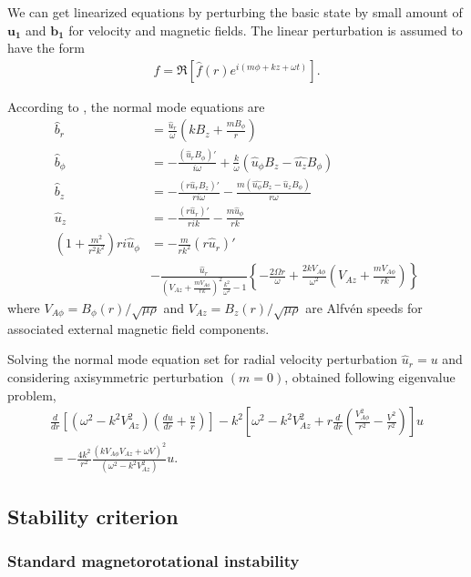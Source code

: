 \documentclass{jfm}
\begin{document}
We can get linearized equations by perturbing the basic state by small amount
of $\mathbf{u_1}$ and $\mathbf{b_1}$ for velocity and magnetic fields. The
linear perturbation is assumed to have the form
\begin{align}
    f=\Re\left[\hat{f}(r)e^{i(m\phi+kz+\omega t)} \right].
\end{align}

According to \cite{Acheson1972}, the normal mode equations are
\begin{align}
    \hat{b}_r &=\frac{\hat{u}_r}{\omega}\left(k B_z +\frac{m B_\phi}{r}\right) \\
    \hat{b}_\phi &= -\frac{(\hat{u}_r B_\phi)'}{i\omega} +\frac{k}{\omega}(\hat{u}_\phi B_z -\hat{u_z}B_\phi) \\
    \hat{b}_z &= -\frac{(r\hat{u}_r B_z)'}{ri\omega} - \frac{m(\hat{u_\phi} B_z - \hat{u}_z B_\phi)}{r\omega} \\
    \hat{u}_z &= -\frac{(r\hat{u}_r)'}{rik}-\frac{m\hat{u}_\phi}{rk} \\
    \left(1+\frac{m^2}{r^2k^2}\right)ri\hat{u}_\phi &= -\frac{m}{rk^2}(r\hat{u}_r)' \nonumber \\ &-\frac{\hat{u}_r}{\left(V_{Az}+\frac{m V_{A\phi}}{rk}\right)^2\frac{k^2}{\omega^2}-1}
    \left\{-\frac{2\Omega r}{\omega}+\frac{2kV_{A\phi}}{\omega^2}\left(V_{Az}+\frac{mV_{A\phi}}{rk}\right)\right\}
\end{align}
where $V_{A\phi}=B_\phi (r) / \sqrt{\mu \rho}$ and  $V_{Az}=B_z (r) / \sqrt{\mu \rho}$ 
are Alfv\'en speeds for associated external magnetic field components.

Solving the normal mode equation set for radial velocity perturbation 
$\hat{u}_r = u$ and considering axisymmetric perturbation $(m=0)$, 
\cite{Acheson1973a} obtained following eigenvalue problem,
\begin{align}
    \frac{d}{dr}\left[(\omega^2-k^2 V_{Az}^2)\left(\frac{du}{dr}+\frac{u}{r}\right)\right]-k^2\left[\omega^2-k^2 V_{Az}^2+r\frac{d}{dr}\left(\frac{V_{A\phi}^2}{r^2}-\frac{V^2}{r^2}\right)\right]u \nonumber \\
    = -\frac{4 k^2}{r^2}\frac{(k V_{A\phi} V_{Az}+\omega V)^2}{(\omega^2-k^2 V_{Az}^2)} u.
\end{align}


%
%
\subsection{Stability criterion}

\subsubsection{Standard magnetorotational instability}
\end{document}
